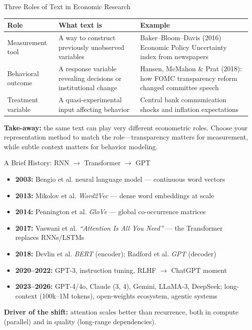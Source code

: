 \begin{frame}{Three Roles of Text in Economic Research}
\begin{center}
\renewcommand{\arraystretch}{1.35}
\begin{tabular}{l p{4cm} p{6cm}}
\toprule
\textbf{Role} & \textbf{What text is} & \textbf{Example} \\
\midrule
Measurement tool & A way to construct previously unobserved variables & Baker--Bloom--Davis (2016) Economic Policy Uncertainty index from newspapers \\
Behavioral outcome & A response variable revealing decisions or institutional change & Hansen, McMahon \& Prat (2018): how FOMC transparency reform changed committee speech \\
Treatment variable & A quasi-experimental input affecting behavior & Central bank communication shocks and inflation expectations \\
\bottomrule
\end{tabular}
\end{center}

\medskip
\textbf{Take-away:} the same text can play very different econometric roles. Choose your representation method to match the role---transparency matters for measurement, while subtle context matters for behavior modeling.
\end{frame}

\begin{frame}{A Brief History: RNN $\rightarrow$ Transformer $\rightarrow$ GPT}
\begin{itemize}
\item \textbf{2003:} Bengio et al. neural language model --- continuous word vectors
\medskip
\item \textbf{2013:} Mikolov et al. \emph{Word2Vec} --- dense word embeddings at scale
\medskip
\item \textbf{2014:} Pennington et al. \emph{GloVe} --- global co-occurrence matrices
\medskip
\item \textbf{2017:} Vaswani et al. \emph{``Attention Is All You Need''} --- the Transformer replaces RNNs/LSTMs
\medskip
\item \textbf{2018:} Devlin et al. \emph{BERT} (encoder); Radford et al. \emph{GPT} (decoder)
\medskip
\item \textbf{2020--2022:} GPT-3, instruction tuning, RLHF $\rightarrow$ ChatGPT moment
\medskip
\item \textbf{2023--2026:} GPT-4/4o, Claude (3, 4), Gemini, LLaMA-3, DeepSeek; long-context (100k--1M tokens), open-weights ecosystem, agentic systems
\end{itemize}

\medskip
\textbf{Driver of the shift:} attention scales better than recurrence, both in compute (parallel) and in quality (long-range dependencies).
\end{frame}

